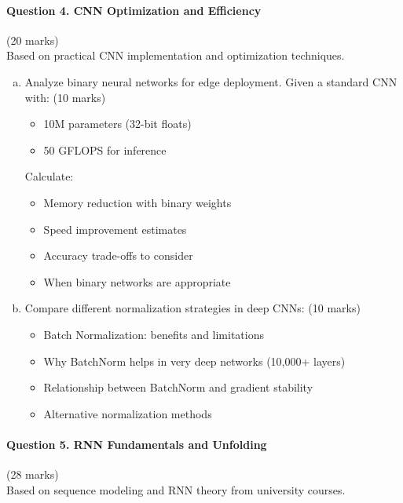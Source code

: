 \documentclass[12pt]{article}
\newcommand{\mediumanswer}{\vspace{3cm}}
\begin{document}
\newpage
\paragraph{Question 4. CNN Optimization and Efficiency}\hfill (20 marks)\\
Based on practical CNN implementation and optimization techniques.

\begin{enumerate}[(a)]
    \item Analyze binary neural networks for edge deployment. Given a standard CNN with: \hfill (10 marks)
    \begin{itemize}
        \item 10M parameters (32-bit floats)
        \item 50 GFLOPS for inference
    \end{itemize}
    
    Calculate:
    \begin{itemize}
        \item Memory reduction with binary weights
        \item Speed improvement estimates
        \item Accuracy trade-offs to consider
        \item When binary networks are appropriate
    \end{itemize}
    
    \mediumanswer
    
    \item Compare different normalization strategies in deep CNNs: \hfill (10 marks)
    \begin{itemize}
        \item Batch Normalization: benefits and limitations
        \item Why BatchNorm helps in very deep networks (10,000+ layers)
        \item Relationship between BatchNorm and gradient stability
        \item Alternative normalization methods
    \end{itemize}
    
    \mediumanswer
\end{enumerate}

\newpage
\paragraph{Question 5. RNN Fundamentals and Unfolding}\hfill (28 marks)\\
Based on sequence modeling and RNN theory from university courses.
\end{document}

